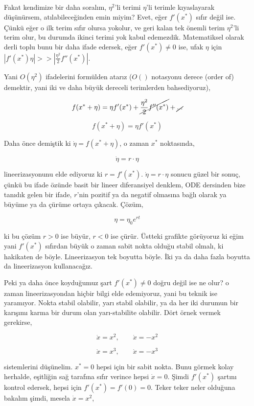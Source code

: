 \documentclass[12pt,fleqn]{article}\usepackage{../../common}
\begin{document}
Fakat kendimize bir daha soralım, $\eta^2$'li terimi $\eta$'li terimle
kıyaslayarak düşünürsem, atılabileceğinden emin miyim? Evet, eğer $f'(x^*)$
sıfır değil ise. Çünkü eğer o ilk terim sıfır olursa yokolur, ve geri kalan tek
önemli terim $\eta^2$'li terim olur, bu durumda ikinci terimi yok kabul
edemezdik. Matematiksel olarak derli toplu bunu bir daha ifade edersek, eğer
$f'(x^*) \ne 0$ ise, ufak $\eta$ için $|f'(x^*) \eta| >> |\frac{\eta^2}{2}
f''(x^*)|$.

Yani $O(\eta^2)$ ifadelerini formülden atarız ($O()$ notasyonu derece (order of)
demektir, yani iki ve daha büyük dereceli terimlerden bahsediyoruz),

$$ f(x^* + \eta) =  \eta f'(x^*) + \cancel{\frac{\eta^2}{2}f''(x^*)} + \cancel{...}$$

$$ f(x^* + \eta) = \eta f'(x^*) $$

Daha önce demiştik ki $\dot{\eta} = f(x^* + \eta)$, o zaman $x^*$ noktasında,

$$\dot{\eta} = r \cdot \eta$$

lineerizasyonunu elde ediyoruz ki $r=f'(x^*)$. $\dot{\eta} = r \cdot \eta$ sonucu
güzel bir sonuç, çünkü bu ifade özünde basit bir lineer diferansiyel denklem,
ODE dersinden bize tanıdık gelen bir ifade, $r$'nin pozitif ya da negatif
olmasına bağlı olarak ya büyüme ya da çürüme ortaya çıkacak. Çözüm,

$$ \eta = \eta_0 e ^{rt} $$


ki bu çözüm $r > 0$ ise büyür, $r < 0$ ise çürür. Üstteki grafikte görüyoruz ki
eğim yani $f'(x^*)$ sıfırdan büyük o zaman sabit nokta olduğu stabil olmalı, ki
hakikaten de böyle. Lineerizasyon tek boyutta böyle. İki ya da daha fazla
boyutta da lineerizasyon kullanacağız. 

Peki ya daha önce koyduğumuz şart $f'(x^*) \ne 0$ doğru değil ise ne olur? o
zaman lineerizasyondan hiçbir bilgi elde edemiyoruz, yani bu teknik ise
yaramıyor. Nokta stabil olabilir, yarı stabil olabilir, ya da her iki durumun
bir karışımı karma bir durum olan yarı-stabilite olabilir. Dört örnek vermek
gerekirse,

$$ \dot{x} = x^2, \qquad \dot{x} = -x^2 
$$

$$ \dot{x} = x^3, \qquad \dot{x} = -x^3 
$$

sistemlerini düşünelim. $x^*=0$ hepsi için bir sabit nokta. Bunu görmek kolay
herhalde, eşitliğin sağ tarafına sıfır verince hepsi $\dot{x} = 0$. Şimdi
$f'(x^*)$ şartını kontrol edersek, hepsi için $f'(x^*) = f'(0) = 0$. Teker teker
neler olduğuna bakalım şimdi, mesela $\dot{x} = x^2$, 
\end{document}
